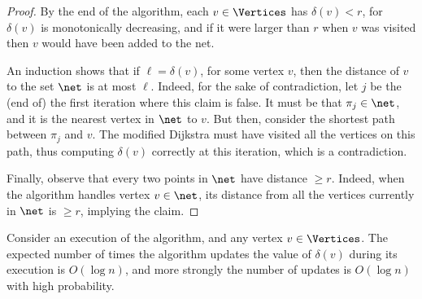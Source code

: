 \begin{proof}
    By the end of the algorithm, each $v \in \Vertices$ has
    $\delta(v) <r$, for $\delta(v)$ is monotonically decreasing, and
    if it were larger than $r$ when $v$ was visited then $v$ would
    have been added to the net.
    
    An induction shows that if $\ell = \delta(v)$, for some vertex
    $v$, then the distance of $v$ to the set $\net$ is at most $\ell$.
    Indeed, for the sake of contradiction, let $j$ be the (end of) the
    first iteration where this claim is false. It must be that
    $\pi_j \in \net$, and it is the nearest vertex in $\net$ to
    $v$. But then, consider the shortest path between $\pi_j$ and
    $v$. The modified Dijkstra must have visited all the vertices on
    this path, thus computing $\delta(v)$ correctly at this iteration,
    which is a contradiction.
    
    Finally, observe that every two points in $\net$ have distance
    $\geq r$. Indeed, when the algorithm handles vertex $v\in \net$,
    its distance from all the vertices currently in $\net$ is
    $\geq r$, implying the claim.
\end{proof}

\begin{lemma}%
    Consider an execution of the algorithm, and any vertex
    $v \in \Vertices$. The expected number of times the algorithm
    updates the value of $\delta(v)$ during its execution is
    $O( \log n )$, and more strongly the number of updates is
    $O(\log n)$ with high probability.
\end{lemma}

